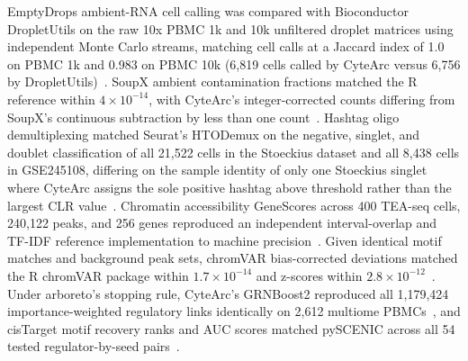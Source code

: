 EmptyDrops ambient-RNA cell calling was compared with Bioconductor DropletUtils on the raw 10x PBMC 1k and 10k unfiltered droplet matrices using independent Monte Carlo streams, matching cell calls at a Jaccard index of 1.0 on PBMC 1k and 0.983 on PBMC 10k (6,819 cells called by CyteArc versus 6,756 by DropletUtils)~\cite{lun2019emptydrops}. SoupX ambient contamination fractions matched the R reference within $4\times 10^{-14}$, with CyteArc's integer-corrected counts differing from SoupX's continuous subtraction by less than one count~\cite{young2020soupx}. Hashtag oligo demultiplexing matched Seurat's HTODemux on the negative, singlet, and doublet classification of all 21,522 cells in the Stoeckius dataset and all 8,438 cells in GSE245108, differing on the sample identity of only one Stoeckius singlet where CyteArc assigns the sole positive hashtag above threshold rather than the largest CLR value~\cite{stoeckius2018,zhang2024hsc}. Chromatin accessibility GeneScores across 400 TEA-seq cells, 240,122 peaks, and 256 genes reproduced an independent interval-overlap and TF-IDF reference implementation to machine precision~\cite{swanson2021}. Given identical motif matches and background peak sets, chromVAR bias-corrected deviations matched the R chromVAR package within $1.7\times 10^{-14}$ and z-scores within $2.8\times 10^{-12}$~\cite{schep2017chromvar}. Under arboreto's stopping rule, CyteArc's GRNBoost2 reproduced all 1,179,424 importance-weighted regulatory links identically on 2,612 multiome PBMCs~\cite{moerman2018grnboost2}, and cisTarget motif recovery ranks and AUC scores matched pySCENIC across all 54 tested regulator-by-seed pairs~\cite{aibar2017scenic,vandesande2020scenic}.

\label{note:Scoring, imputation and fate agreement}

